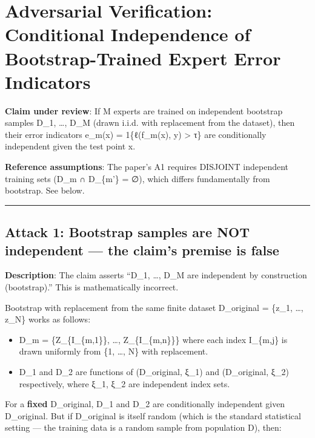 \documentclass[
  12pt,
]{article}
\author{SCX}
\date{2026}
\providecommand{\tightlist}{%
  \setlength{\itemsep}{0pt}\setlength{\parskip}{0pt}}
\begin{document}
\section{Adversarial Verification: Conditional Independence of
Bootstrap-Trained Expert Error
Indicators}\label{adversarial-verification-conditional-independence-of-bootstrap-trained-expert-error-indicators}

\textbf{Claim under review}: If M experts are trained on independent
bootstrap samples D\_1, \ldots, D\_M (drawn i.i.d. with replacement from
the dataset), then their error indicators e\_m(x) = 1\{ℓ(f\_m(x), y)
\textgreater{} τ\} are conditionally independent given the test point x.

\textbf{Reference assumptions}: The paper's A1 requires DISJOINT
independent training sets (D\_m ∩ D\_\{m'\} = ∅), which differs
fundamentally from bootstrap. See below.

\begin{center}\rule{0.5\linewidth}{0.5pt}\end{center}

\subsection{Attack 1: Bootstrap samples are NOT independent --- the
claim's premise is
false}\label{attack-1-bootstrap-samples-are-not-independent-the-claims-premise-is-false}

\textbf{Description}: The claim asserts ``D\_1, \ldots, D\_M are
independent by construction (bootstrap).'' This is mathematically
incorrect.

Bootstrap with replacement from the same finite dataset D\_original =
\{z\_1, \ldots, z\_N\} works as follows:

\begin{itemize}
\tightlist
\item
  D\_m = \{Z\_\{I\_\{m,1\}\}, \ldots, Z\_\{I\_\{m,n\}\}\} where each
  index I\_\{m,j\} is drawn uniformly from \{1, \ldots, N\} with
  replacement.
\item
  D\_1 and D\_2 are functions of (D\_original, ξ\_1) and (D\_original,
  ξ\_2) respectively, where ξ\_1, ξ\_2 are independent index sets.
\end{itemize}

For a \textbf{fixed} D\_original, D\_1 and D\_2 are conditionally
independent given D\_original. But if D\_original is itself random
(which is the standard statistical setting --- the training data is a
random sample from population D), then:
\end{document}
